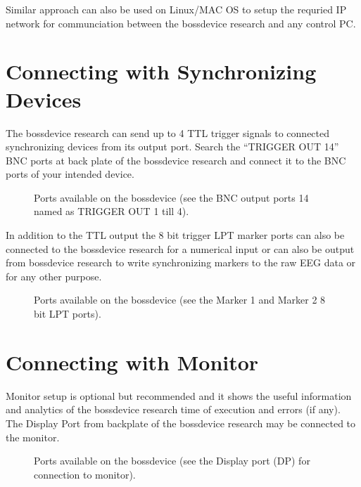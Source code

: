 \documentclass[letterpaper,10pt,english]{sphinxmanual}
\begin{document}
Similar approach can also be used on Linux/MAC OS to setup the requried IP network for communciation between the bossdevice research and any control PC.


\section{Connecting with Synchronizing Devices}
\label{\detokenize{2_setup_bossdevice_research:connecting-with-synchronizing-devices}}
The bossdevice research can send up to 4 TTL trigger signals to connected synchronizing devices from its output port. Search the “TRIGGER OUT 1\sphinxhyphen{}4” BNC ports at back plate of the bossdevice research and connect it to the BNC ports of your intended device.

\begin{figure}[htbp]
\centering
\capstart

\noindent{}
\caption{Ports available on the bossdevice (see the BNC output ports 1\sphinxhyphen{}4 named as TRIGGER OUT 1 till 4).}\label{\detokenize{2_setup_bossdevice_research:id5}}\end{figure}

In addition to the TTL output the 8 bit trigger LPT marker ports can also be connected to the bossdevice research for a numerical input or can also be output from bossdevice research to write synchronizing markers to the raw EEG data or for any other purpose.

\begin{figure}[htbp]
\centering
\capstart

\noindent{}
\caption{Ports available on the bossdevice (see the Marker 1 and Marker 2 8 bit LPT ports).}\label{\detokenize{2_setup_bossdevice_research:id6}}\end{figure}


\section{Connecting with Monitor}
\label{\detokenize{2_setup_bossdevice_research:connecting-with-monitor}}
Monitor setup is optional but recommended and it shows the useful information and analytics of the bossdevice research time of execution and errors (if any). The Display Port from backplate of the bossdevice research may be connected to the monitor.

\begin{figure}[htbp]
\centering
\capstart

\noindent{}
\caption{Ports available on the bossdevice (see the Display port (DP) for connection to monitor).}\label{\detokenize{2_setup_bossdevice_research:id7}}\end{figure}
\end{document}
